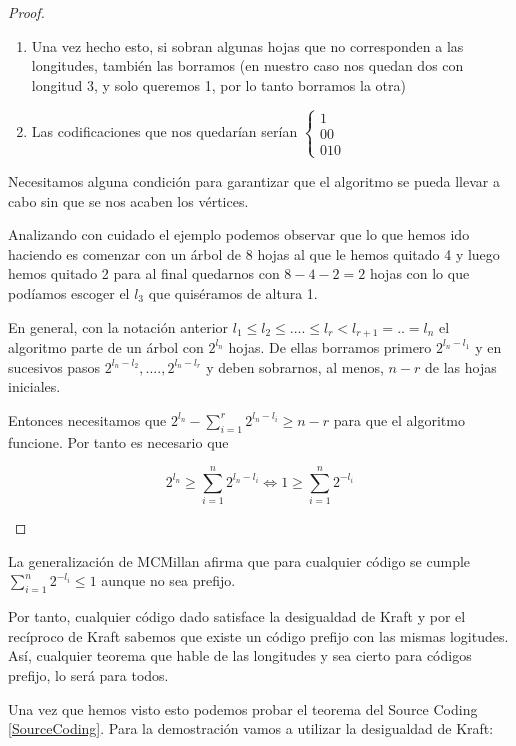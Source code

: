 \begin{proof}
\begin{itemize}
\begin{enumerate}
		\item Una vez hecho esto, si sobran algunas hojas que no corresponden a las longitudes, también las borramos (en nuestro caso nos quedan dos con longitud 3, y solo queremos 1, por lo tanto borramos la otra)

		\item Las codificaciones que nos quedarían serían $\begin{cases}
		1\\00\\010
		\end{cases}$
	\end{enumerate}
	Necesitamos alguna condición para garantizar que el algoritmo se pueda llevar a cabo sin que se nos acaben los vértices.

	Analizando con cuidado el ejemplo podemos observar que lo que hemos ido haciendo es comenzar con un árbol de 8 hojas al que le hemos quitado 4 y luego hemos quitado 2 para al final quedarnos con $8-4-2 = 2$ hojas con lo que podíamos escoger el $l_3$ que quiséramos de altura 1.

	En general, con la notación anterior $l_1 \leq l_2 \leq .... \leq l_{r} < l_{r+1} = .. = l_n$ el algoritmo parte de un árbol con $2^{l_n}$ hojas. De ellas borramos primero $2^{l_n - l_1}$ y en sucesivos pasos $2^{l_n - l_2} , .... , 2^{l_n - l_r}$ y deben sobrarnos, al menos, $n-r$ de las hojas iniciales.

	Entonces necesitamos que $2^{l_n} - \sum_{i=1}^{r} 2^{l_n - l_i} \geq n-r$ para que el algoritmo funcione. Por tanto es necesario que

	\[2^{l_n} \geq \sum_{i=1}^{n} 2^{l_n - l_i} \iff 1 \geq  \sum_{i=1}^{n} 2^{- l_i} \]

\end{itemize}
\end{proof}

\obs La generalización de MCMillan afirma que para cualquier código se cumple $\sum_{i=1}^{n} 2^{-l_i} \leq 1$ aunque no sea prefijo.

Por tanto, cualquier código dado satisface la desigualdad de Kraft y por el recíproco de Kraft sabemos que existe un código prefijo con las mismas logitudes.
Así, cualquier teorema que hable de las longitudes y sea cierto para códigos prefijo, lo será para todos.

Una vez que hemos visto esto podemos probar el teorema del Source Coding \ref{SourceCoding}. Para la demostración vamos a utilizar la desigualdad de Kraft:

